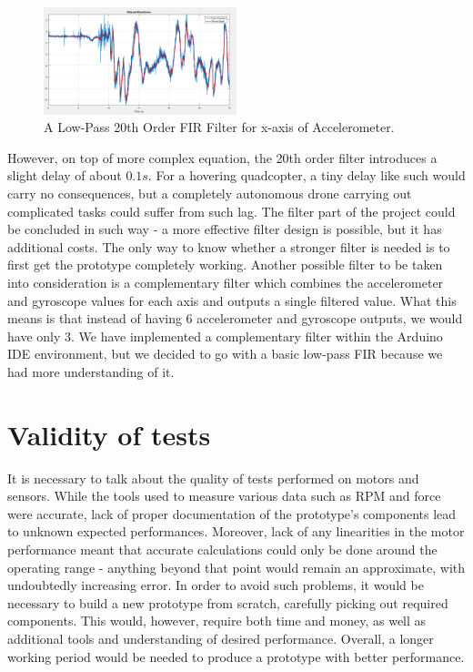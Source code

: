 \begin{figure}[H]
  \centering
    \includegraphics[width=0.5\textwidth]{images/newFilter.png}
	\caption{A Low-Pass 20th Order FIR Filter for x-axis of Accelerometer.}
	\label{newFilter}
\end{figure}

However, on top of more complex equation, the 20th order filter introduces a slight delay of about $0.1s$. For a hovering quadcopter, a tiny delay like such would carry no consequences, but a completely autonomous drone carrying out complicated tasks could suffer from such lag.
The filter part of the project could be concluded in such way - a more effective filter design is possible, but it has additional costs. The only way to know whether a stronger filter is needed is to first get the prototype completely working.
Another possible filter to be taken into consideration is a complementary filter which combines the accelerometer and gyroscope values for each axis and outputs a single filtered value. What this means is that instead of having 6 accelerometer and gyroscope outputs, we would have only 3. We have implemented a complementary filter within the Arduino IDE environment, but we decided to go with a basic low-pass FIR because we had more understanding of it.

\section{Validity of tests}
It is necessary to talk about the quality of tests performed on motors and sensors. While the tools used to measure various data such as RPM and force were accurate, lack of proper documentation of the prototype's components lead to unknown expected performances. Moreover, lack of any linearities in the motor performance meant that accurate calculations could only be done around the operating range - anything beyond that point would remain an approximate, with undoubtedly increasing error.
In order to avoid such problems, it would be necessary to build a new prototype from scratch, carefully picking out required components. This would, however, require both time and money, as well as additional tools and understanding of desired performance. Overall, a longer working period would be needed to produce a prototype with better performance.

